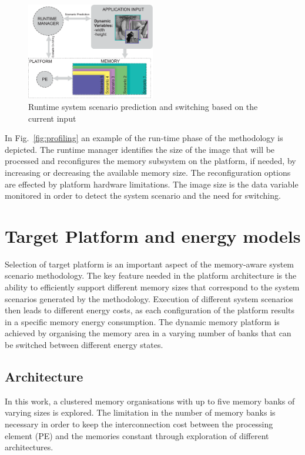 \documentclass[a4paper,conference]{IEEEtran}
\begin{document}
\begin{figure}[!t]
\centering
\includegraphics[width=0.50\textwidth]{Images/switching.eps}
\caption{Runtime system scenario prediction and switching based on the current input}
\label{fig:runtime}
\end{figure}

In Fig.~\ref{fig:profiling} an example of the run-time phase of the methodology is depicted. The runtime manager identifies the size of the image that will be processed and reconfigures the memory subsystem on the platform, if needed, by increasing or decreasing the available memory size. The reconfiguration options are effected by platform hardware limitations. The image size is the data variable monitored in order to detect the system scenario and the need for switching.

\section{Target Platform and energy models}
\label{sec:platform}

Selection of target platform is an important aspect of the memory-aware system scenario methodology. The key feature needed in the platform architecture is the ability to efficiently support different memory sizes that correspond to the system scenarios generated by the methodology. Execution of different system scenarios then leads to different energy costs, as each configuration of the platform results in a specific memory energy consumption. The dynamic memory platform is achieved by organising the memory area in a varying number of banks that can be switched between different energy states. 

\subsection{Architecture}

In this work, a clustered memory organisations with up to five memory banks of varying sizes is explored. The limitation in the number of memory banks is necessary in order to keep the interconnection cost between the processing element (PE) and the memories constant through exploration of different architectures. 
\end{document}
